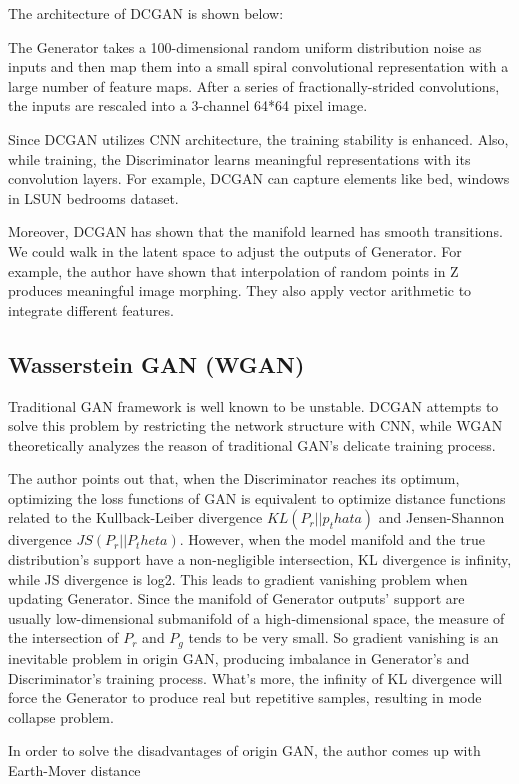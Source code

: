 The architecture of DCGAN is shown below: 

The Generator takes a 100-dimensional random uniform distribution noise as inputs and then map them into a small spiral convolutional representation with a large number of feature maps. After a series of fractionally-strided convolutions, the inputs are rescaled into a 3-channel 64*64 pixel image. 

Since DCGAN utilizes CNN architecture, the training stability is enhanced. Also, while training, the Discriminator learns meaningful representations with its convolution layers. For example, DCGAN can capture elements like bed, windows in LSUN bedrooms dataset. 

Moreover, DCGAN has shown that the manifold learned has smooth transitions. We could walk in the latent space to adjust the outputs of Generator. For example, the author have shown that interpolation of random points in Z produces meaningful image morphing. They also apply vector arithmetic to integrate different features.


\subsection{Wasserstein GAN (WGAN)}
Traditional GAN framework is well known to be unstable. DCGAN attempts to solve this problem by restricting the network structure with CNN, while WGAN theoretically analyzes the reason of traditional GAN’s delicate training process.

The author points out that, when the Discriminator reaches its optimum, optimizing the loss functions of GAN is equivalent to optimize distance functions related to the Kullback-Leiber divergence $KL(P_r||p_thata)$ and Jensen-Shannon divergence $JS(P_r||P_theta)$. However, when the model manifold and the true distribution’s support have a non-negligible intersection, KL divergence is infinity, while JS divergence is log2. This leads to gradient vanishing problem when updating Generator. Since the manifold of Generator outputs’ support are usually low-dimensional submanifold of a high-dimensional space, the measure of the intersection of $P_r$ and $P_g$ tends to be very small. So gradient vanishing is an inevitable problem in origin GAN, producing imbalance in Generator’s and Discriminator’s training process. What’s more, the infinity of KL divergence will force the Generator to produce real but repetitive samples, resulting in mode collapse problem.

In order to solve the disadvantages of origin GAN, the author comes up with Earth-Mover distance

